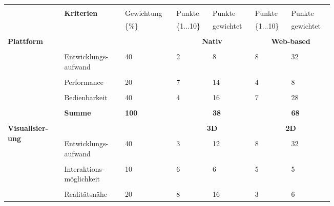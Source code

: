 \documentclass[main.tex]{subfiles} %
\begin{document}
\begin{table}[ht]
    \centering
    \begin{tabular}{|p{0.14\linewidth}|p{0.15\linewidth}|p{0.115\linewidth}|p{0.08\linewidth}|p{0.09\linewidth}|p{0.08\linewidth}|p{0.09\linewidth}|}
    \hline
        &&&&&&\\[-9pt]
        & \multirow{2}{*}{\textbf{Kriterien}} & Gewichtung & Punkte & Punkte & Punkte & Punkte \\[1pt]
        &  & \{\%\} & \{1...10\} & gewichtet & \{1...10\} & gewichtet \\[1pt]
        \hline
        \hline
        & \multicolumn{2}{c|}{} & \multicolumn{2}{c|}{} & \multicolumn{2}{c|}{} \\[-9pt]
        \multirow{5}{4em}{\textbf{Plattform}} & \multicolumn{2}{c|}{} & \multicolumn{2}{c|}{\textbf{Nativ}} & \multicolumn{2}{c|}{\textbf{Web-based}} \\[1pt]
        \cline{2-7}
        &&&&&&\\[-9pt]
        & Entwicklungs-aufwand & 40 & 2 & 8 & 8 & 32 \\[1pt]
        \cline{2-7}
        &&&&&&\\[-9pt]
        & Performance & 20 & 7 & 14 & 4 & 8 \\[1pt]
        \cline{2-7}
        &&&&&&\\[-9pt]
        & Bedienbarkeit & 40 & 4 & 16 & 7 & 28 \\[1pt]
        \cline{2-7}
        &&&&&&\\[-9pt]
        & \textbf{Summe} & \textbf{100} &  & \textbf{38} &  & \textbf{68} \\[1pt]
        \hline
        \hline
        & \multicolumn{2}{c|}{} & \multicolumn{2}{c|}{} & \multicolumn{2}{c|}{} \\[-9pt]
        \multirow{6}{4em}{\textbf{Visualisier-ung}} & \multicolumn{2}{c|}{} & \multicolumn{2}{c|}{\textbf{3D}} & \multicolumn{2}{c|}{\textbf{2D}} \\[1pt]
        \cline{2-7}
        &&&&&&\\[-9pt]
        & Entwicklungs-aufwand & 40 & 3 & 12 & 8 & 32 \\[1pt]
        \cline{2-7}
        &&&&&&\\[-9pt]
        & Interaktions-möglichkeit & 10 & 6 & 6 & 5 & 5 \\[1pt]
        \cline{2-7}
        &&&&&&\\[-9pt]
        & Realitätsnähe & 20 & 8 & 16 & 3 & 6 \\[1pt]
        \cline{2-7}

\end{tabular}
\end{table}
\end{document}
